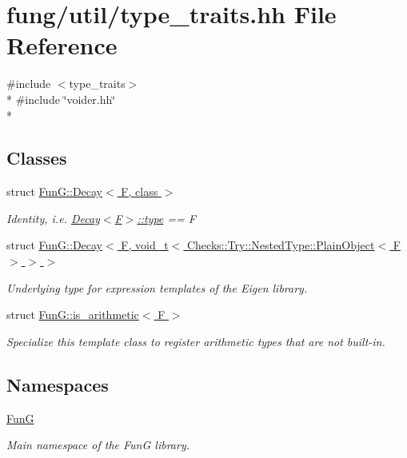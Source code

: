 \hypertarget{type__traits_8hh}{\section{fung/util/type\-\_\-traits.hh File Reference}
\label{type__traits_8hh}
}
{\ttfamily \#include $<$type\-\_\-traits$>$}\\*
{\ttfamily \#include \char`\"{}voider.\-hh\char`\"{}}\\*
\subsection*{Classes}
\begin{DoxyCompactItemize}
\item 
struct \hyperlink{structFunG_1_1Decay}{Fun\-G\-::\-Decay$<$ F, class $>$}
\begin{DoxyCompactList}\small\item\em Identity, i.\-e. \hyperlink{structFunG_1_1Decay_a4b2916cbb7c8587ab3fccc9b896b9df4}{Decay$<$\-F$>$\-::type} == F \end{DoxyCompactList}\item 
struct \hyperlink{structFunG_1_1Decay_3_01F_00_01void__t_3_01Checks_1_1Try_1_1NestedType_1_1PlainObject_3_01F_01_4_01_4_01_4}{Fun\-G\-::\-Decay$<$ F, void\-\_\-t$<$ Checks\-::\-Try\-::\-Nested\-Type\-::\-Plain\-Object$<$ F $>$ $>$ $>$}
\begin{DoxyCompactList}\small\item\em Underlying type for expression templates of the Eigen library. \end{DoxyCompactList}\item 
struct \hyperlink{structFunG_1_1is__arithmetic}{Fun\-G\-::is\-\_\-arithmetic$<$ F $>$}
\begin{DoxyCompactList}\small\item\em Specialize this template class to register arithmetic types that are not built-\/in. \end{DoxyCompactList}\end{DoxyCompactItemize}
\subsection*{Namespaces}
\begin{DoxyCompactItemize}
\item 
\hyperlink{namespaceFunG}{Fun\-G}
\begin{DoxyCompactList}\small\item\em Main namespace of the Fun\-G library. \end{DoxyCompactList}\end{DoxyCompactItemize}
